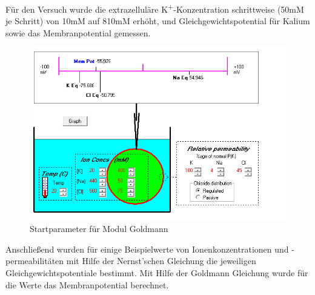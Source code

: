 \documentclass[a4paper]{article}
\begin{document}
\vspace{1.0\baselineskip}
\noindent Für den Versuch wurde die extrazelluläre K\textsuperscript{+}-Konzentration schrittweise (50mM je Schritt) von 10mM auf 810mM erhöht, und Gleichgewichtspotential für Kalium sowie das Membranpotential gemessen. \vspace{1.0\baselineskip}
\begin{figure}[H]
    \centering
    \includegraphics[scale=0.8]{images/Aufgabe1_1_Aufbau.png}
    \caption{Startparameter für Modul Goldmann}
    \label{fig:my_label}
\end{figure}
\noindent Anschließend wurden für einige Beispielwerte von Ionenkonzentrationen und -permeabilitäten mit Hilfe der Nernst'schen Gleichung die jeweiligen Gleichgewichtspotentiale bestimmt. Mit Hilfe der Goldmann Gleichung wurde für die Werte das Membranpotential berechnet.
\end{document}
